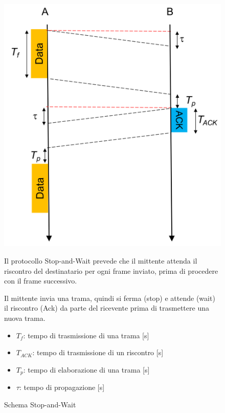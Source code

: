 \begin{figure}[htbp]
    \centering
    \begin{minipage}{0.4\textwidth}
        \includegraphics[width=\linewidth]{images/stopwait.png}
        \caption{Schema Stop-and-Wait}
    \end{minipage}%
    \hfill
    \begin{minipage}{0.55\textwidth}
        Il protocollo Stop-and-Wait prevede che il mittente attenda il riscontro del destinatario per ogni frame inviato, prima di procedere con il frame successivo.

        Il mittente invia una trama, quindi si ferma (stop) e attende (wait) il riscontro (Ack) da parte del ricevente prima di trasmettere una nuova trama.
\begin{itemize}
    \item $T_f$: tempo di trasmissione di una trama [s]
    \item $T_{ACK}$: tempo di trasmissione di un riscontro [s]
    \item $T_p$: tempo di elaborazione di una trama [s]
    \item $\tau$: tempo di propagazione [s]
\end{itemize}
    \end{minipage}
\end{figure}

